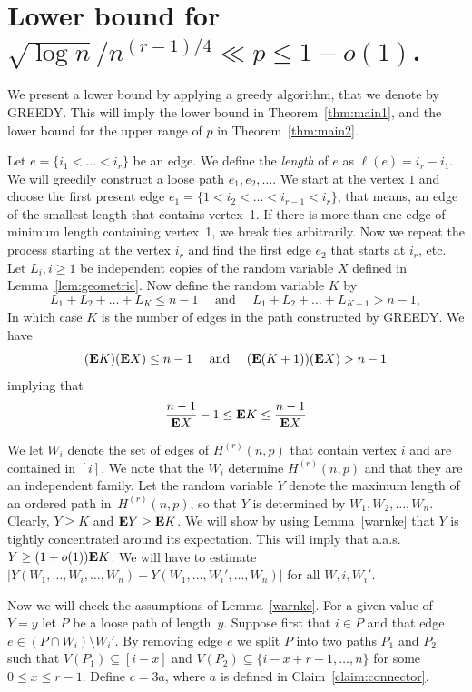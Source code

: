 \documentclass[12pt,reqno]{amsart}
\theoremstyle{remark}
\def\E{\mbox{{\bf E}}}
\def\E{\mbox{{\bf E}}}
\begin{document}
\section{Lower bound for $\sqrt{\log n}/n^{(r-1)/4}\ll p \le 1-o(1)$.}\label{sec:3}
We present a lower bound by applying a greedy algorithm, that we denote by GREEDY. This will imply the lower bound in Theorem~\ref{thm:main1}, and the lower bound for the upper range of $p$ in Theorem~\ref{thm:main2}.


Let $e=\{i_1<\dots<i_r\}$ be an edge. We define the \emph{length} of $e$ as $\ell(e)=i_r-i_1$. We will greedily construct a loose path $e_1,e_2,\dots$. We start at the vertex $1$ and choose the first present edge $e_1=\{1<i_2<\dots<i_{r-1}<i_r\}$, that means, an edge of the smallest length that contains vertex~1. If there is more than one edge of minimum length containing vertex~1, we break ties arbitrarily.
Now we repeat the process starting at the vertex $i_r$ and find the first edge $e_2$ that starts at $i_r$, etc. Let $L_i,i\geq 1$ be independent copies of the random variable $X$ defined in Lemma~\ref{lem:geometric}. Now define the random variable $K$ by
\[
L_1+L_2+\dots +L_K \le n-1 \quad \text{ and }\quad L_1+L_2+\dots +L_{K+1} > n-1,
\]
In which case $K$ is the number of edges in the path constructed by GREEDY. We have
\[
(\E K)(\E X)\le n-1 \quad \text{ and }\quad (\E (K+1))(\E X)>n-1
\]
implying that 
\begin{equation}\label{XK}
\frac{n-1}{\E X}-1\leq \E K\leq \frac{n-1}{\E X}
\end{equation}

We let $W_i$ denote the set of edges of $H^{(r)}(n, p)$ that contain vertex $i$ and are contained in $[i]$. We note that the $W_i$ determine $H^{(r)}(n, p)$ and that they are an independent family. Let the random variable $Y$ denote the maximum length of an ordered path in~$H^{(r)}(n, p)$, so that $Y$ is determined by $W_1,W_2,\ldots,W_n$. Clearly, $Y\ge K$ and $\E Y \ge \E K$.
We will show by using Lemma~\ref{warnke} that $Y$ is tightly concentrated around its expectation. This will imply that a.a.s.\ $Y \ge (1+o(1))\E K$. We will have to estimate $| Y(W_1,\dots,W_i,\dots,W_n)-Y(W_1,\dots,W_i',\dots,W_n) |$ for all $W,i,W_i'$.

Now we will check the assumptions of Lemma~\ref{warnke}. For a given value of $Y=y$ let $P$ be a loose path of length~$y$. Suppose first that $i\in P$ and that edge $e\in (P\cap W_i)\setminus W_i'$. By removing edge $e$ we split $P$ into two paths $P_1$ and $P_2$ such that $V(P_1) \subseteq [i-x]$ and $V(P_2) \subseteq \{i-x+r-1,\dots,n\}$ for some $0\leq x\leq r-1$. Define $c=3a$, where $a$ is defined in Claim~\ref{claim:connector}. 
\end{document}

